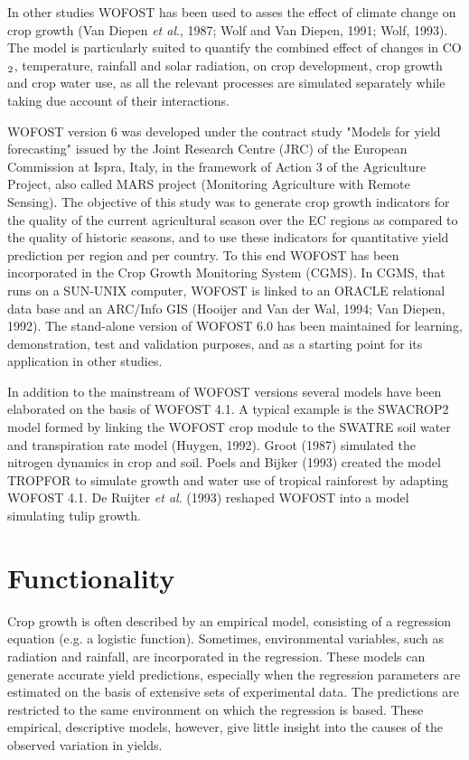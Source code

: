 \bigskip
In other studies WOFOST has been used to asses the effect of climate change on crop
growth (Van Diepen {\it et al\/}., 1987; Wolf and Van Diepen, 1991; Wolf, 1993). The model
is particularly suited to quantify the com\-bined effect of changes in CO$_{{\rm 2}}$, tempera\-ture,
rainfall and solar radiation, on crop development, crop growth and crop water use, as all
the relevant processes are simulated separately while taking due account of their interac\-tions.

\bigskip
WOFOST version 6 was developed under the contract study {\nobreak}"Models for yield forecast\-ing" issued by the Joint Research Centre (JRC) of the European Commission at Ispra,
Italy, in the framework of Action 3 of the Agriculture Project, also called MARS project
(Monitoring Agriculture with Remote Sens\-ing). The objective of this study was to
generate crop growth indicators for the quality of the current agricultural season over the
EC regions as compared to the quality of historic seasons, and to use these indicators for
quantitative yield prediction per region and per country. To this end WOFOST has been
incorporated in the Crop Growth Monitoring System (CGMS). In CGMS, that runs on a
SUN-UNIX computer, WOFOST is linked to an ORACLE relational data base and an
ARC/Info GIS (Hooijer and Van der Wal, 1994; Van Diepen, 1992). The stand-alone
version of WOFOST 6.0 has been maintained for learning, demon\-stration, test and
validation purposes, and as a starting point for its application in other studies.

\bigskip
In addition to the mainstream of WOFOST versions several models have been elaborated
on the basis of WOFOST 4.1. A typical example is the SWACROP2 model formed by
linking the WOFOST crop module to the SWATRE soil water and transpiration rate
model (Huygen, 1992). Groot (1987) simulated the nitrogen dynamics in crop and soil.
Poels and Bijker (1993) created the model TROPFOR to simulate growth and water use
of tropical rainforest by adapting WOFOST 4.1. De Ruijter {\it et al\/}. (1993) reshaped
WOFOST into a model simulating tulip growth.

\bigskip
\bigskip
\bigskip
\bigskip
\bigskip
\bigskip
\bigskip
\bigskip

\section{Functionality  }

Crop growth is often described by an empirical model, consisting of a regression equation
(e.g. a logistic function). Sometimes, environmental variables, such as radiation and
rainfall, are incorporated in the regression. These models can generate accurate yield
predictions, especially when the regression parameters are estimated on the basis of
extensive sets of experimental data. The predictions are restricted to the same environ\-ment on which the regression is based. These empirical, descriptive models, however,
give little insight into the causes of the observed variation in yields.  

